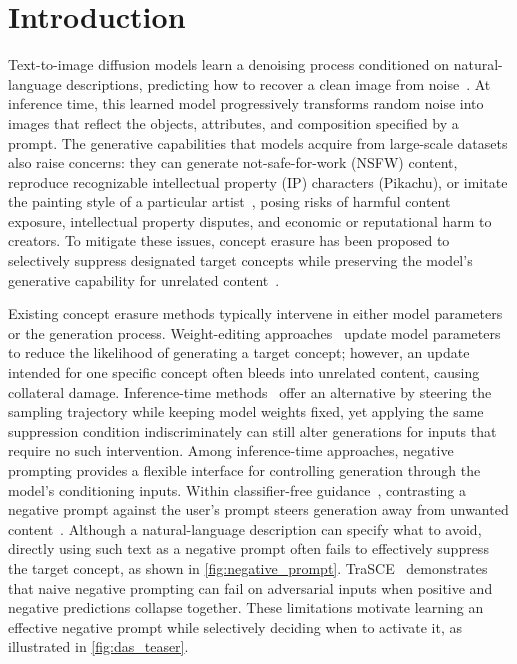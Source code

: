 \section{Introduction}
\label{sec:intro}

Text-to-image diffusion models learn a denoising process conditioned on natural-language descriptions, predicting how to recover a clean image from noise~\cite{NEURIPS2020_4c5bcfec,Rombach_2022_CVPR,pmlr-v235-esser24a,flux2024}.
At inference time, this learned model progressively transforms random noise into images that reflect the objects, attributes, and composition specified by a prompt.
The generative capabilities that models acquire from large-scale datasets also raise concerns:
they can generate not-safe-for-work (NSFW) content, reproduce recognizable intellectual property (IP) characters (\eg Pikachu), or imitate the painting style of a particular artist~\cite{Schramowski_2023_CVPR,Gandikota_2023_ICCV},
posing risks of harmful content exposure, intellectual property disputes, and economic or reputational harm to creators.
To mitigate these issues, concept erasure has been proposed to selectively suppress designated target concepts while preserving the model's generative capability for unrelated content~\cite{Gandikota_2023_ICCV}.

Existing concept erasure methods typically intervene in either model parameters or the generation process.
Weight-editing approaches~\cite{Gandikota_2023_ICCV,Gandikota_2024_WACV,Kumari_2023_ICCV,pmlr-v267-gao25j,MACE,AdaVD} update model parameters to reduce the likelihood of generating a target concept; however, an update intended for one specific concept often bleeds into unrelated content, causing collateral damage.
Inference-time methods~\cite{Schramowski_2023_CVPR,pan2025safecfg,shin2025promptbasedsafetyguidanceineffective,jain2026rethinkingnegativepromptingconcept} offer an alternative by steering the sampling trajectory while keeping model weights fixed,
yet applying the same suppression condition indiscriminately can still alter generations for inputs that require no such intervention.
Among inference-time approaches, negative prompting provides a flexible interface for controlling generation through the model's conditioning inputs.
Within classifier-free guidance~\cite{CFG}, contrasting a negative prompt against the user's prompt steers generation away from unwanted content~\cite{jain2026rethinkingnegativepromptingconcept}.
Although a natural-language description can specify what to avoid, directly using such text as a negative prompt often fails to effectively suppress the target concept, as shown in \cref{fig:negative_prompt}.
TraSCE~\cite{jain2026rethinkingnegativepromptingconcept} demonstrates that naive negative prompting can fail on adversarial inputs when positive and negative predictions collapse together.
These limitations motivate learning an effective negative prompt while selectively deciding when to activate it, as illustrated in \cref{fig:das_teaser}.


